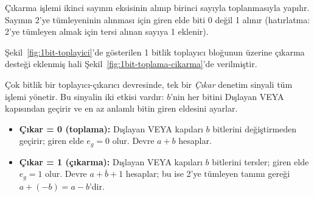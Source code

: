 Çıkarma işlemi ikinci sayının eksisinin alınıp birinci sayıyla toplanmasıyla yapılır. Sayının 2'ye tümleyeninin alınması için giren elde biti 0 değil 1 alınır (hatırlatma: 2'ye tümleyen almak için tersi alınan sayıya 1 eklenir).

Şekil~\ref{fig:1bit-toplayici}'de gösterilen 1 bitlik toplayıcı bloğunun üzerine çıkarma desteği eklenmiş hali Şekil~\ref{fig:1bit-toplama-cikarma}'de verilmiştir.

Çok bitlik bir toplayıcı-çıkarıcı devresinde, tek bir \emph{Çıkar} denetim sinyali tüm işlemi yönetir. Bu sinyalin iki etkisi vardır: $b$'nin her bitini Dışlayan VEYA kapısından geçirir ve en az anlamlı bitin giren eldesini ayarlar.

\begin{itemize}
    \item \textbf{Çıkar = 0 (toplama):} Dışlayan VEYA kapıları $b$ bitlerini değiştirmeden geçirir; giren elde $e_{g}=0$ olur. Devre $a + b$ hesaplar.
    \item \textbf{Çıkar = 1 (çıkarma):} Dışlayan VEYA kapıları $b$ bitlerini tersler; giren elde $e_{g}=1$ olur. Devre $a + \overline{b} + 1$ hesaplar; bu ise 2'ye tümleyen tanımı gereği $a + (-b) = a - b$'dir.
\end{itemize}

